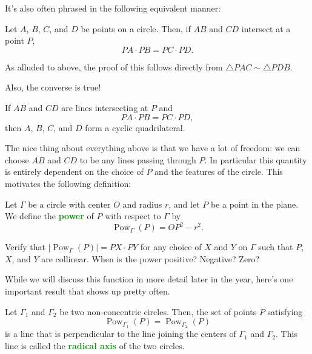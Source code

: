 \documentclass{scrartcl}
\providecommand{\pow}{\operatorname{Pow}}
\providecommand{\vocab}[1]{{\textbf{\textcolor{ForestGreen}{#1}}}}
\begin{document}
It's also often phrased in the following equivalent manner:
\begin{corollary}
	Let $A$, $B$, $C$, and $D$ be points on a circle. Then, if $AB$ and $CD$
	intersect at a point $P$,
	\[PA\cdot PB = PC\cdot PD.\]
\end{corollary}
As alluded to above, the proof of this follows directly from
$\triangle PAC\sim\triangle PDB$.

Also, the converse is true!
\begin{theorem}
	If $AB$ and $CD$ are lines intersecting at $P$ and
	\[PA\cdot PB = PC\cdot PD,\]
	then $A$, $B$, $C$, and $D$ form a cyclic quadrilateral.
\end{theorem}

The nice thing about everything above is that we have a lot of freedom:
we can choose $AB$ and $CD$ to be any lines passing through $P$.
In particular this quantity is entirely dependent on the choice of
$P$ and the features of the circle. This motivates the following definition:

\begin{definition}
	Let $\Gamma$ be a circle with center $O$ and radius $r$,
	and let $P$ be a point in the plane.
	We define the \vocab{power} of $P$ with respect to $\Gamma$ by
	\[\pow_{\Gamma}(P) = OP^2 - r^2.\]
\end{definition}
\begin{exercise}
	Verify that $|\pow_\Gamma(P)| = PX\cdot PY$ for any choice of
	$X$ and $Y$ on $\Gamma$ such that $P$, $X$, and $Y$ are collinear.
	When is the power positive? Negative? Zero?
\end{exercise}
\pagebreak
While we will discuss this function in more detail later in the year,
here's one important result that shows up pretty often.

\begin{theorem}
	Let $\Gamma_1$ and $\Gamma_2$ be two non-concentric circles.
	Then, the set of points $P$ satisfying
	\[\pow_{\Gamma_1}(P) = \pow_{\Gamma_2}(P)\]
	is a line that is perpendicular to the line joining the centers of
	$\Gamma_1$ and $\Gamma_2$. This line is called the
	\vocab{radical axis} of the two circles.
\end{theorem}
\end{document}
